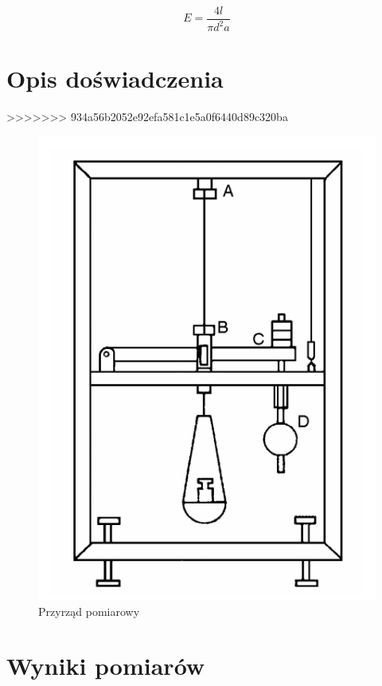 \documentclass[a4paper,10pt,twoside]{article}
\begin{document}
$$ E = \frac{4l}{\pi d^2 a} $$

\section{Opis doświadczenia}
>>>>>>> 934a56b2052e92efa581c1e5a0f6440d89c320ba

\begin{figure}[!htp]
\centerline{\includegraphics[scale=0.35]{przyrzad.png}}
\caption{Przyrząd pomiarowy}
\label{fig:tl}
\end{figure}

\section{Wyniki pomiarów}
\end{document}
